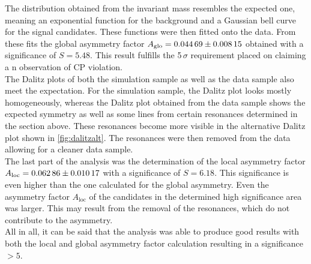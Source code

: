 The distribution obtained from the invariant mass resembles the expected one, 
meaning an exponential function for the background and a Gaussian bell curve 
for the signal candidates. These functions were then fitted onto the data. 
From these fits the global asymmetry factor $A_\mathrm{glo} = \num{0.04469\pm0.00815}$ 
obtained with a significance of $S = 5.48$. This result fulfills the 5\,$\sigma$ 
requirement placed on claiming a n observation of CP violation.\\

The Dalitz plots of both the simulation sample as well as the data sample 
also meet the expectation. For the simulation sample, the Dalitz plot looks 
mostly homogeneously, whereas the Dalitz plot obtained from the data sample 
shows the expected symmetry as well as some lines from certain resonances 
determined in the section above. These resonances become more visible in the 
alternative Dalitz plot shown in \autoref{fig:dalitzalt}. 
The resonances were then removed from the data allowing for a cleaner data sample.\\

The last part of the analysis was the determination of the local asymmetry factor 
$A_\mathrm{loc} = \num{0.06286\pm0.01017}$ with a significance of $S = 6.18$. 
This significance is even higher than the one calculated for the global asymmetry. 
Even the asymmetry factor $A_\mathrm{loc}$ of the candidates in the determined high 
significance area was larger. This may result from the removal of the resonances, 
which do not contribute to the asymmetry.\\

All in all, it can be said that the analysis was able to produce good results 
with both the local and global asymmetry factor calculation resulting in a significance $>5$.


